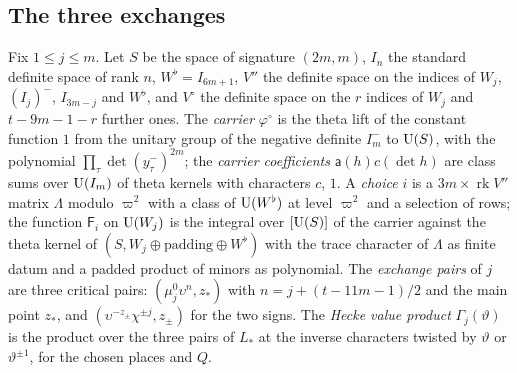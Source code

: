 \subsection{The three exchanges}\label{ss:three-exchanges}
Fix $1\le j\le m$. Let $S$ be the space of signature $(2m,m)$, $I_n$ the standard definite space of rank $n$, $W^\flat=I_{6m+1}$, $V''$ the definite space on the indices of $W_j$, $(I_j)^-$,
$I_{3m-j}$ and $W^\flat$, and $V^\circ$ the definite space on the $r$ indices of $W_j$ and $t-9m-1-r$ further ones. The \emph{carrier} $\varphi^\circ$ is the theta lift of the constant function $1$ from the
unitary group of the negative definite $I_m^-$ to $\operatorname{U}(S)$, with the polynomial $\prod_\tau\det(y^-_\tau)^{2m}$; the \emph{carrier coefficients} $\mathsf a(h)c(\det h)$ are class sums over $\operatorname{U}(I_m)$ of theta kernels with
characters $c$, $1$. A \emph{choice} $i$ is a $3m\times\operatorname{rk}V''$ matrix $\Lambda$ modulo $\varpi^2$ with a class of $\operatorname{U}(W^\flat)$ at level $\varpi^2$ and a selection of rows; the function $\mathsf F_i$ on $\operatorname{U}(W_j)$ is the
integral over $[\operatorname{U}(S)]$ of the carrier against the theta kernel of $(S,W_j\oplus\mathrm{padding}\oplus W^\flat)$ with the trace character of $\Lambda$ as finite datum and a padded product of minors as
polynomial. The \emph{exchange pairs} of $j$ are three critical pairs: $(\mu^0_j\upsilon^n,z_*)$ with $n=j+(t-11m-1)/2$ and the main point $z_*$, and $(\upsilon^{-z_\pm}\chi^{\pm j},z_\pm)$ for the two signs. The
\emph{Hecke value product} $\Gamma_j(\vartheta)$ is the product over the three pairs of $L_*$ at the inverse characters twisted by $\vartheta$ or $\vartheta^{\pm1}$, for the chosen places and $Q$.

